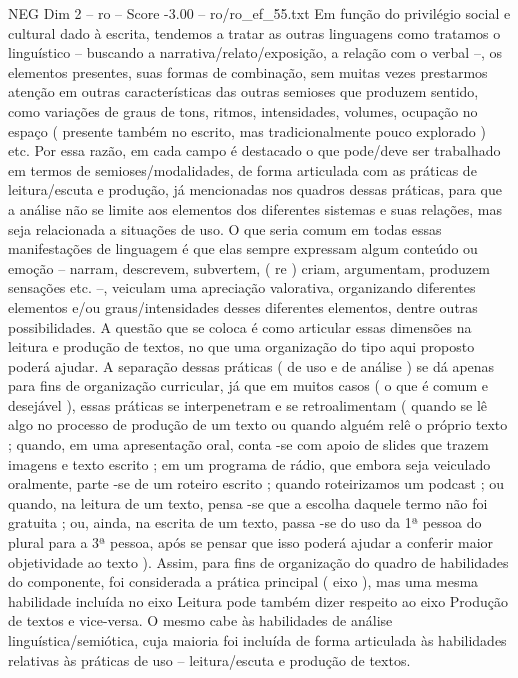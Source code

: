\begin{textsample}{NEG Dim 2 – ro – Score -3.00 – ro/ro\_ef\_55.txt}  \label{ex:f2_neg_105}
Em função do privilégio social e cultural dado à escrita, tendemos a tratar as outras linguagens como tratamos o linguístico – buscando a narrativa/relato/exposição, a relação com o verbal –, os elementos presentes, suas formas de combinação, sem muitas vezes prestarmos atenção em outras características das outras semioses que produzem sentido, como variações de graus de tons, ritmos, intensidades, volumes, ocupação no espaço ( presente também no escrito, mas tradicionalmente pouco explorado ) etc.
Por essa razão, em cada campo é destacado o que pode/deve ser trabalhado em termos de semioses/modalidades, de forma articulada com as práticas de leitura/escuta e produção, já mencionadas nos quadros dessas práticas, para que a análise não se limite aos elementos dos diferentes sistemas e suas relações, mas seja relacionada a situações de uso.
O que seria comum em todas essas manifestações de linguagem é que elas sempre expressam algum conteúdo ou emoção – narram, descrevem, subvertem, ( re ) criam, argumentam, produzem sensações etc. –, veiculam uma apreciação valorativa, organizando diferentes elementos e/ou graus/intensidades desses diferentes elementos, dentre outras possibilidades.
A questão que se coloca é como articular essas dimensões na leitura e produção de textos, no que uma organização do tipo aqui proposto poderá ajudar.
A separação dessas práticas ( de uso e de análise ) se dá apenas para fins de organização curricular, já que em muitos casos ( o que é comum e desejável ), essas práticas se interpenetram e se retroalimentam ( quando se lê algo no processo de produção de um texto ou quando alguém relê o próprio texto ; quando, em uma apresentação oral, conta -se com apoio de slides que trazem imagens e texto escrito ; em um programa de rádio, que embora seja veiculado oralmente, parte -se de um roteiro escrito ; quando roteirizamos um podcast ; ou quando, na leitura de um texto, pensa -se que a escolha daquele termo não foi gratuita ; ou, ainda, na escrita de um texto, passa -se do uso da 1ª pessoa do plural para a 3ª pessoa, após se pensar que isso poderá ajudar a conferir maior objetividade ao texto ).
Assim, para fins de organização do quadro de habilidades do componente, foi considerada a prática principal ( eixo ), mas uma mesma habilidade incluída no eixo Leitura pode também dizer respeito ao eixo Produção de textos e vice-versa.
O mesmo cabe às habilidades de análise linguística/semiótica, cuja maioria foi incluída de forma articulada às habilidades relativas às práticas de uso – leitura/escuta e produção de textos.

\end{textsample}
